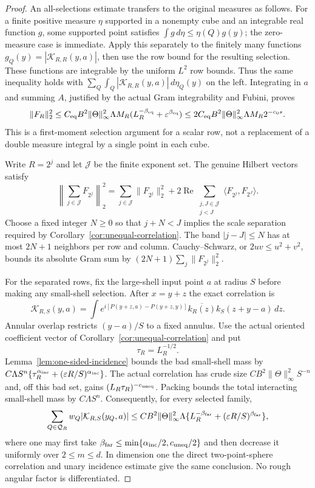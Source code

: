\documentclass[11pt]{article}
\numberwithin{equation}{section}
\theoremstyle{remark}
\theoremstyle{definition}
\newcommand{\norm}[1]{\lVert #1\rVert}
\begin{document}
\begin{proof}
An all-selections estimate transfers to the original measures as
follows.  For a finite positive measure $\eta$ supported in a nonempty
cube and an integrable real function $g$, some supported point satisfies
$\int g\,d\eta\le\eta(Q)g(y)$; the zero-measure case is immediate.
Apply this separately to the finitely many functions
$g_Q(y)=|\mathcal K_{R,R}(y,a)|$, then use the row bound for the resulting
selection.  These functions are integrable by the uniform $L^2$ row
bounds.  Thus the same inequality holds with
$\sum_Q\int_Q|\mathcal K_{R,R}(y,a)|\,d\eta_Q(y)$ on the left.
Integrating in $a$ and summing $A$, justified by the actual Gram
integrability and Fubini, proves
\[
 \norm{F_R}_2^2
 \le C_{\rm eq}B^2\norm\Theta_\infty^2\Lambda M_R
       (L_R^{-\beta_{\rm eq}}+\varepsilon^{\beta_{\rm eq}})
 \le 2C_{\rm eq}B^2\norm\Theta_\infty^2\Lambda M_R2^{-c_0s}.
\]
This is a first-moment selection argument for a scalar row, not a
replacement of a double measure integral by a single point in each cube.

Write $R=2^j$ and let $\mathcal J$ be the finite exponent set.
The genuine Hilbert vectors satisfy
\begin{equation}\label{eq:collective-pair-expansion}
 \left\|\sum_{j\in\mathcal J}F_{2^j}\right\|_2^2
 =\sum_{j\in\mathcal J}\norm{F_{2^j}}_2^2
  +2\operatorname{Re}\sum_{\substack{j,J\in\mathcal J\\j<J}}
          \langle F_{2^j},F_{2^J}\rangle.
\end{equation}
Choose a fixed integer $N\ge0$ so that $j+N<J$ implies the scale
separation required by Corollary~\ref{cor:unequal-correlation}.
The band $|j-J|\le N$ has at most $2N+1$ neighbors per row and column.
Cauchy--Schwarz, or $2uv\le u^2+v^2$, bounds its absolute Gram sum by
$(2N+1)\sum_j\norm{F_{2^j}}_2^2$.

For the separated rows, fix the large-shell input point $a$ at radius
$S$ before making any small-shell selection.  After $x=y+z$ the exact
correlation is
\[
 \mathcal K_{R,S}(y,a)
 =\int e^{i[P(y+z,a)-P(y+z,y)]}
             \overline{k_R(z)}k_S(z+y-a)\,dz.
\]
Annular overlap restricts $(y-a)/S$ to a fixed annulus.
Use the actual oriented coefficient vector of
Corollary~\ref{cor:unequal-correlation} and put
\begin{equation}\label{eq:collective-tau}
 \tau_R=L_R^{-1/2}.
\end{equation}
Lemma~\ref{lem:one-sided-incidence} bounds the bad small-shell mass by
$C\Lambda S^n\{\tau_R^{\alpha_{\rm inc}}+
(\varepsilon R/S)^{\alpha_{\rm inc}}\}$.
The actual correlation has crude size
$CB^2\norm\Theta_\infty^2S^{-n}$ and, off this bad set, gains
$(L_R\tau_R)^{-c_{\rm uneq}}$.
Packing bounds the total interacting small-shell mass by
$C\Lambda S^n$.  Consequently, for every selected family,
\[
 \sum_{Q\in\mathcal Q_R}w_Q|\mathcal K_{R,S}(y_Q,a)|
 \le CB^2\norm\Theta_\infty^2\Lambda
     \{L_R^{-\beta_{\rm far}}+(\varepsilon R/S)^{\beta_{\rm far}}\},
\]
where one may first take
$\beta_{\rm far}\le\min\{\alpha_{\rm inc}/2,c_{\rm uneq}/2\}$
and then decrease it uniformly over $2\le m\le d$.
In dimension one the direct two-point-sphere correlation and unary
incidence estimate give the same conclusion.  No rough angular factor
is differentiated.


\end{proof}
\end{document}
